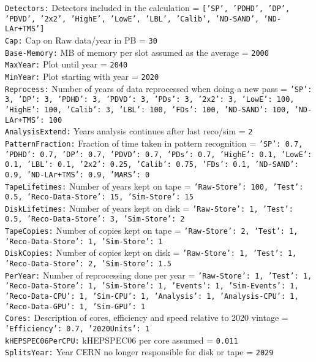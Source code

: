 {\tt Detectors:} Detectors included in the calculation = {\tt ['SP', 'PDHD', 'DP', 'PDVD', '2x2', 'HighE', 'LowE', 'LBL', 'Calib', 'ND-SAND', 'ND-LAr+TMS']} \\
{\tt Cap:} Cap on Raw data/year in PB = {\tt 30} \\
{\tt Base-Memory:} MB of memory per slot assumed as the average = {\tt 2000} \\
{\tt MaxYear:} Plot until year = {\tt 2040} \\
{\tt MinYear:} Plot starting with year = {\tt 2020} \\
{\tt Reprocess:} Number of years of data reprocessed when doing a new pass = {\tt {'SP': 3, 'DP': 3, 'PDHD': 3, 'PDVD': 3, 'PDs': 3, '2x2': 3, 'LowE': 100, 'HighE': 100, 'Calib': 3, 'LBL': 100, 'FDs': 100, 'ND-SAND': 100, 'ND-LAr+TMS': 100}} \\
{\tt AnalysisExtend:} Years analysis continues after last reco/sim = {\tt 2} \\
{\tt PatternFraction:} Fraction of time taken in pattern recognition = {\tt {'SP': 0.7, 'PDHD': 0.7, 'DP': 0.7, 'PDVD': 0.7, 'PDs': 0.7, 'HighE': 0.1, 'LowE': 0.1, 'LBL': 0.1, '2x2': 0.25, 'Calib': 0.75, 'FDs': 0.1, 'ND-SAND': 0.9, 'ND-LAr+TMS': 0.9, 'MARS': 0}} \\
{\tt TapeLifetimes:} Number of years kept on tape = {\tt {'Raw-Store': 100, 'Test': 0.5, 'Reco-Data-Store': 15, 'Sim-Store': 15}} \\
{\tt DiskLifetimes:} Number of years kept on disk = {\tt {'Raw-Store': 1, 'Test': 0.5, 'Reco-Data-Store': 3, 'Sim-Store': 2}} \\
{\tt TapeCopies:} Number of copies kept on tape = {\tt {'Raw-Store': 2, 'Test': 1, 'Reco-Data-Store': 1, 'Sim-Store': 1}} \\
{\tt DiskCopies:} Number of copies kept on disk = {\tt {'Raw-Store': 1, 'Test': 1, 'Reco-Data-Store': 2, 'Sim-Store': 1.5}} \\
{\tt PerYear:} Number of reprocessing done per year = {\tt {'Raw-Store': 1, 'Test': 1, 'Reco-Data-Store': 1, 'Sim-Store': 1, 'Events': 1, 'Sim-Events': 1, 'Reco-Data-CPU': 1, 'Sim-CPU': 1, 'Analysis': 1, 'Analysis-CPU': 1, 'Reco-Data-GPU': 1, 'Sim-GPU': 1}} \\
{\tt Cores:} Description of cores, efficiency and speed relative to 2020 vintage = {\tt {'Efficiency': 0.7, '2020Units': 1}} \\
{\tt kHEPSPEC06PerCPU:} kHEPSPEC06 per core assumed = {\tt 0.011} \\
{\tt SplitsYear:} Year CERN no longer responsible for disk or tape = {\tt 2029} \\
